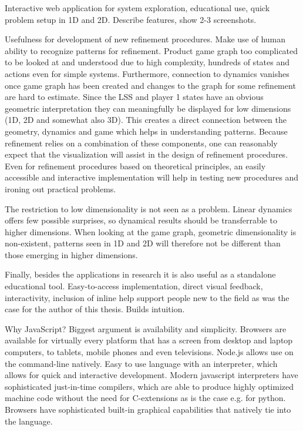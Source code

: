 Interactive web application for system exploration, educational use, quick problem setup in 1D and 2D.
Describe features, show 2-3 screenshots.

Usefulness for development of new refinement procedures.
Make use of human ability to recognize patterns for refinement.
Product game graph too complicated to be looked at and understood due to high complexity, hundreds of states and actions even for simple systems.
Furthermore, connection to dynamics vanishes once game graph has been created and changes to the graph for some refinement are hard to estimate.
Since the LSS and player 1 states have an obvious geometric interpretation they can meaningfully be displayed for low dimensions (1D, 2D and somewhat also 3D).
This creates a direct connection between the geometry, dynamics and game which helps in understanding patterns.
Because refinement relies on a combination of these components, one can reasonably expect that the visualization will assist in the design of refinement procedures.
Even for refinement procedures based on theoretical principles, an easily accessible and interactive implementation will help in testing new procedures and ironing out practical problems.

The restriction to low dimensionality is not seen as a problem.
Linear dynamics offers few possible surprises, so dynamical results should be transferrable to higher dimensions.
When looking at the game graph, geometric dimensionality is non-existent, patterns seen in 1D and 2D will therefore not be different than those emerging in higher dimensions.

Finally, besides the applications in research it is also useful as a standalone educational tool.
Easy-to-access implementation, direct visual feedback, interactivity, inclusion of inline help support people new to the field as was the case for the author of this thesis.
Builds intuition.

Why JavaScript?
Biggest argument is availability and simplicity.
Browsers are available for virtually every platform that has a screen from desktop and laptop computers, to tablets, mobile phones and even televisions.
Node.js allows use on the command-line natively.
Easy to use language with an interpreter, which allows for quick and interactive development.
Modern javascript interpreters have sophisticated just-in-time compilers, which are able to produce highly optimized machine code without the need for C-extensions as is the case e.g. for python.
Browsers have sophisticated built-in graphical capabilities that natively tie into the language.

